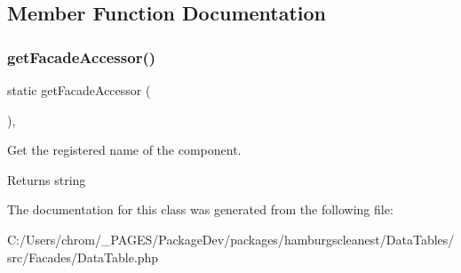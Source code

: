 \subsection{Member Function Documentation}
\mbox{\label{classhamburgscleanest_1_1_data_tables_1_1_facades_1_1_data_table_a19a808201f41f32f71a0532cb49b450f}} 
\subsubsection{\texorpdfstring{get\+Facade\+Accessor()}{getFacadeAccessor()}}
{\footnotesize\ttfamily static get\+Facade\+Accessor (\begin{DoxyParamCaption}{ }\end{DoxyParamCaption})\hspace{0.3cm}{\ttfamily [static]}, {\ttfamily [protected]}}

Get the registered name of the component.

\begin{DoxyReturn}{Returns}
string 
\end{DoxyReturn}


The documentation for this class was generated from the following file\+:\begin{DoxyCompactItemize}
\item 
C\+:/\+Users/chrom/\+\_\+\+P\+A\+G\+E\+S/\+Package\+Dev/packages/hamburgscleanest/\+Data\+Tables/src/\+Facades/Data\+Table.\+php\end{DoxyCompactItemize}
